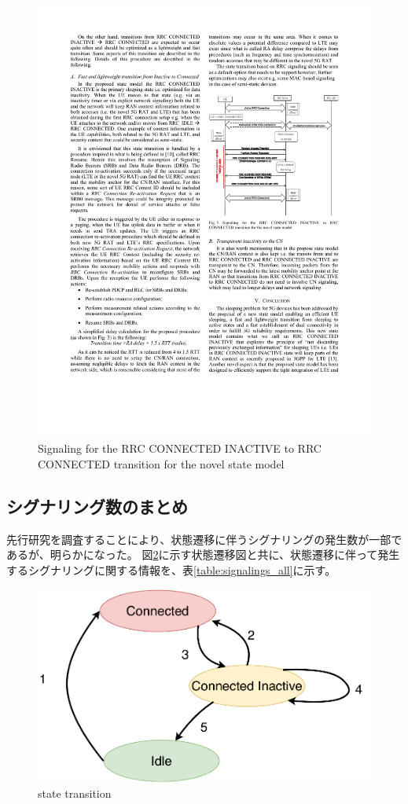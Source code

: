 \documentclass[a4j]{ujarticle}
\begin{document}
\begin{figure}[htbp]
  \centering
  \includegraphics[width=0.9\hsize]{Signaling_for_the_RRC_CONNECTED_INACTIVE_to_RRC_CONNECTED_transition_for_the_novel_state_model.pdf}
  \caption{Signaling for the RRC CONNECTED INACTIVE to RRC CONNECTED transition for the novel state model}
  \label{Signaling_for_the_RRC_CONNECTED_INACTIVE_to_RRC_CONNECTED_transition_for_the_novel_state_model}
\end{figure}

\clearpage
\subsection{シグナリング数のまとめ}
先行研究を調査することにより、状態遷移に伴うシグナリングの発生数が一部であるが、明らかになった。
図\ref{state_id}に示す状態遷移図と共に、状態遷移に伴って発生するシグナリングに関する情報を、表\ref{table:signalings_all}に示す。

\begin{figure}[htbp]
  \centering
  \includegraphics[width=0.9\hsize]{state_id.pdf}
  \caption{state transition}
  \label{state_id}
\end{figure}
\end{document}
